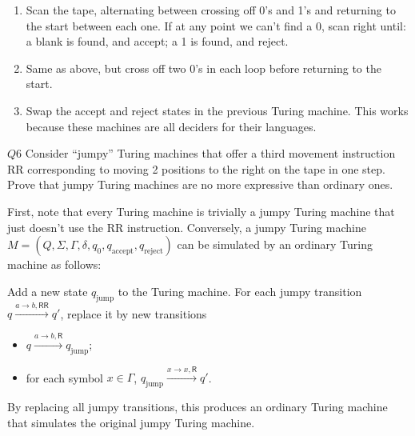 \documentclass{article}
\theoremstyle{definition}
\theoremstyle{definition}
\theoremstyle{remark}
\begin{document}
\bigskip

\begin{enumerate}
    \item[$(i)$] Scan the tape, alternating between crossing off 0's and 1's and returning to the start between each one. If at any point we can't find a 0, scan right until: a blank is found, and accept; a 1 is found, and reject.
    
    \item[$(ii)$] Same as above, but cross off two 0's in each loop before returning to the start.

    \item[$(iii)$] Swap the accept and reject states in the previous Turing machine. This works because these machines are all deciders for their languages.
\end{enumerate}




\begin{questionbox}{$Q6$}
    Consider ``jumpy'' Turing machines that offer a third movement instruction \textsf{RR} corresponding to moving 2 positions to the right on the tape in one step. Prove that jumpy Turing machines are no more expressive than ordinary ones.
\end{questionbox}

\bigskip

First, note that every Turing machine is trivially a jumpy Turing machine that just doesn't use the \textsf{RR} instruction. Conversely, a jumpy Turing machine $M=(Q,\Sigma,\Gamma,\delta,q_0,q_\text{accept},q_\text{reject})$ can be simulated by an ordinary Turing machine as follows:

Add a new state $q_\text{jump}$ to the Turing machine. For each jumpy transition $q\xrightarrow{a\rightarrow b,\textsf{RR}}q'$, replace it by new transitions
\begin{itemize}
    \item $q\xrightarrow{a\rightarrow b,\textsf{R}}q_\text{jump}$;
    \item for each symbol $x\in\Gamma$, $q_\text{jump}\xrightarrow{x\rightarrow x,\textsf{R}}q'$.
\end{itemize}
By replacing all jumpy transitions, this produces an ordinary Turing machine that simulates the original jumpy Turing machine.
\end{document}

